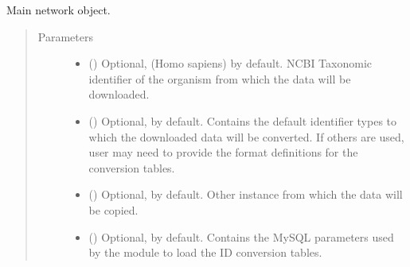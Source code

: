 \documentclass[letterpaper,10pt,english]{sphinxmanual}
\begin{document}
\begin{fulllineitems}
\label{\detokenize{main:pypath.main.PyPath}}
Main network object.
\begin{quote}\begin{description}
\item[{Parameters}] \leavevmode\begin{itemize}
\item {} 
 () \textendash{} Optional,  (Homo sapiens) by default. NCBI Taxonomic
identifier of the organism from which the data will be
downloaded.

\item {} 
 () \textendash{} Optional,  by default. Contains
the default identifier types to which the downloaded data will
be converted. If others are used, user may need to provide the
format definitions for the conversion tables.

\item {} 
 ({\hyperref[\detokenize{main:pypath.main.PyPath}]{}}) \textendash{} Optional,  by default. Other {\hyperref[\detokenize{main:pypath.main.PyPath}]{}} instance
from which the data will be copied.

\item {} 
 () \textendash{} Optional,  by default. Contains the MySQL
parameters used by the  module to load
the ID conversion tables.


\end{itemize}
\end{description}
\end{quote}
\end{fulllineitems}
\end{document}
